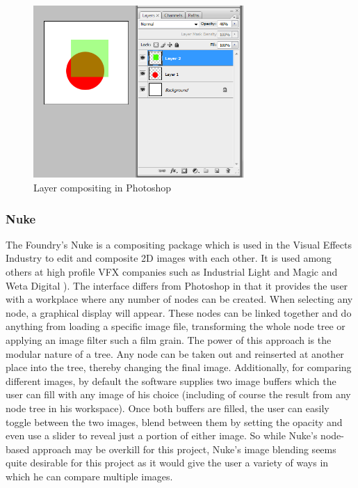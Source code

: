\documentclass[a4paper,11pt,titlepage]{article}
\begin{document}
\begin{figure}[ht!]
\centering
\includegraphics[width=80mm]{graphics/photoshop_01.png}
\caption{Layer compositing in Photoshop}
\label{fig:UIdesign1}
\end{figure}

\subsubsection{Nuke}
The Foundry's Nuke is a compositing package which is used in the Visual Effects Industry to edit and composite 2D images with each other. It is used among others at high profile VFX companies such as Industrial Light and Magic and Weta Digital\cite{nuke1} \cite{nuke2}). The interface differs from Photoshop in that it provides the user with a workplace where any number of nodes can be created. When selecting any node, a graphical display will appear. These nodes can be linked together and do anything from loading a specific image file, transforming the whole node tree or applying an image filter such a film grain. The power of this approach is the modular nature of a tree. Any node can be taken out and reinserted at another place into the tree, thereby changing the final image. Additionally, for comparing different images, by default the software supplies two image buffers which the user can fill with any image of his choice (including of course the result from any node tree in his workspace). Once both buffers are filled, the user can easily toggle between the two images, blend between them by setting the opacity and even use a slider to reveal just a portion of either image. So while Nuke's node-based approach may be overkill for this project, Nuke's image blending seems quite desirable for this project as it would give the user a variety of ways in which he can compare multiple images. 
\end{document}
